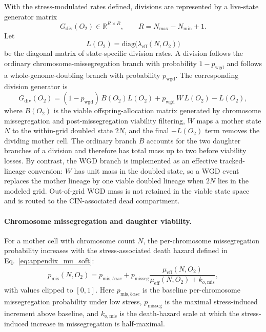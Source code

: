 \documentclass[11pt]{article}
\begin{document}
With the stress-modulated rates defined, divisions are represented by a live-state generator matrix
\begin{equation}
G_{\mathrm{div}}(O_2) \in \mathbb{R}^{R\times R},
\qquad
R=N_{\max}-N_{\min}+1.
\label{eq:appendix_gdiv_dimension}
\end{equation}
Let
\begin{equation}
L(O_2)=\mathrm{diag}\!\bigl(\lambda_{\mathrm{eff}}(N,O_2)\bigr)
\label{eq:appendix_division_rate_matrix}
\end{equation}
be the diagonal matrix of state-specific division rates. A division follows the ordinary chromosome-missegregation branch with probability $1-p_{\mathrm{wgd}}$ and follows a whole-genome-doubling branch with probability $p_{\mathrm{wgd}}$. The corresponding division generator is
\begin{equation}
G_{\mathrm{div}}(O_2)=
(1-p_{\mathrm{wgd}})\,B(O_2)L(O_2)
+
p_{\mathrm{wgd}}\,W\,L(O_2)
-L(O_2),
\label{eq:appendix_gdiv}
\end{equation}
where $B(O_2)$ is the viable offspring-allocation matrix generated by chromosome missegregation and post-missegregation viability filtering, $W$ maps a mother state $N$ to the within-grid doubled state $2N$, and the final $-L(O_2)$ term removes the dividing mother cell. The ordinary branch $B$ accounts for the two daughter branches of a division and therefore has total mass up to two before viability losses. By contrast, the WGD branch is implemented as an effective tracked-lineage conversion: $W$ has unit mass in the doubled state, so a WGD event replaces the mother lineage by one viable doubled lineage when $2N$ lies in the modeled grid. Out-of-grid WGD mass is not retained in the viable state space and is routed to the CIN-associated dead compartment.

\paragraph{Chromosome missegregation and daughter viability.}

For a mother cell with chromosome count $N$, the per-chromosome missegregation probability increases with the stress-associated death hazard defined in Eq.~\eqref{eq:appendix_mu_soft}:
\begin{equation}
p_{\mathrm{mis}}(N,O_2)
= p_{\mathrm{mis},base} +
p_{\mathrm{misseg}}
\frac{\mu_{\mathrm{eff}}(N,O_2)}
{\mu_{\mathrm{eff}}(N,O_2)+k_{o,\mathrm{mis}}},
\label{eq:appendix_pmis_hypoxia}
\end{equation}
with values clipped to $[0,1]$. Here $p_{\mathrm{mis},base}$ is the baseline per-chromosome missegregation probability under low stress, $p_{\mathrm{misseg}}$ is the maximal stress-induced increment above baseline, and $k_{o,\mathrm{mis}}$ is the death-hazard scale at which the stress-induced increase in missegregation is half-maximal.
\end{document}
